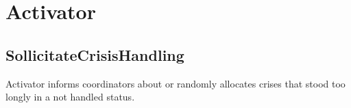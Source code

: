 % 
% 
% 

 
% 
% 

\section{Activator}

\subsection{SollicitateCrisisHandling}
\label{operation:sollicitatecrisishandling}

Activator informs coordinators about or randomly allocates crises that stood too
longly in a not handled status.

